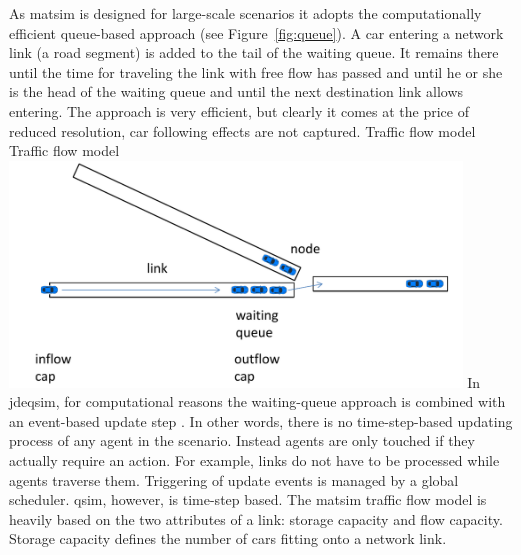 As \gls{matsim} is designed for large-scale \glspl{scenario} it adopts the computationally efficient queue-based approach (see Figure~\ref{fig:queue}). A car entering a network link (\ie a road segment) is added to the tail of the waiting queue. It remains there until the time for traveling the link with free flow has passed and until he or she is the head of the waiting queue and until the next destination link allows entering. The approach is very efficient, but clearly it comes at the price of reduced resolution, \ie car following effects are not captured.   
%
\createfigure%
{Traffic flow model}%
{Traffic flow model}%
{\label{fig:queue}}%
{\includegraphics[width=0.9\textwidth, angle=0]{using/figures/queue.pdf}}%
{}
%
In \gls{jdeqsim}, for computational reasons the waiting-queue approach is combined with an event-based update step \citep[][]{CharyparEtAl_TRB_2009}. In other words, there is no time-step-based updating process of any agent in the scenario. Instead agents are only touched if they actually require an action. For example, links do not have to be processed while agents traverse them.
%
%
Triggering of update events is managed by a global scheduler. \gls{qsim}, however, is time-step based. 
%
%
%
The \gls{matsim} traffic flow model is heavily based on the two attributes of a link: storage capacity and flow capacity. Storage capacity defines the number of cars fitting onto a network link.
%
%

